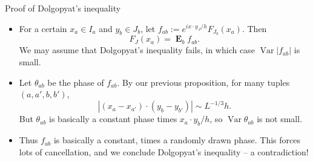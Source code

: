 \documentclass[10pt]{beamer}
\DeclareMathOperator{\Var}{Var}
\DeclareMathOperator*{\Expect}{\mathbf E}
\begin{document}
\begin{frame}{Proof of Dolgopyat's inequality}
\begin{itemize}
\item For a certain $x_a \in I_a$ and $y_b \in J_b$, let $f_{ab} := e^{ix\cdot y_J/h} F_{J_b}(x_a)$. Then 
$$F_J(x_a) = \Expect_b f_{ab}.$$
We may assume that Dolgopyat's inequality fails, in which case $\Var |f_{ab}|$ is small. \pause
\item Let $\theta_{ab}$ be the phase of $f_{ab}$. By our previous proposition, for many tuples $(a, a', b, b')$,
$$|(x_a - x_{a'}) \cdot (y_b - y_{b'})| \sim L^{-1/3} h.$$
But $\theta_{ab}$ is basically a constant phase times $x_a \cdot y_b/h$, so $\Var \theta_{ab}$ is not small. \pause
\item Thus $f_{ab}$ is basically a constant, times a randomly drawn phase. This forces lots of cancellation, and we conclude Dolgopyat's inequality -- a contradiction!
\end{itemize}
\end{frame}
\end{document}
